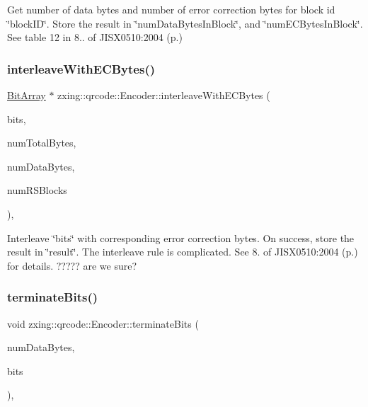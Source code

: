 Get number of data bytes and number of error correction bytes for block id \char`\"{}block\+I\+D\char`\"{}. Store the result in \char`\"{}num\+Data\+Bytes\+In\+Block\char`\"{}, and \char`\"{}num\+E\+C\+Bytes\+In\+Block\char`\"{}. See table 12 in 8.. of J\+I\+S\+X0510\+:2004 (p.) \mbox{\label{classzxing_1_1qrcode_1_1_encoder_a56e0adac48f552a92621f7510df2412f}} 
\subsubsection{\texorpdfstring{interleave\+With\+E\+C\+Bytes()}{interleaveWithECBytes()}}
{\footnotesize\ttfamily \mbox{\hyperlink{classzxing_1_1_bit_array}{Bit\+Array}} $\ast$ zxing\+::qrcode\+::\+Encoder\+::interleave\+With\+E\+C\+Bytes (\begin{DoxyParamCaption}\item[{const \mbox{\hyperlink{classzxing_1_1_bit_array}{Bit\+Array}} \&}]{bits,  }\item[{int}]{num\+Total\+Bytes,  }\item[{int}]{num\+Data\+Bytes,  }\item[{int}]{num\+R\+S\+Blocks }\end{DoxyParamCaption})\hspace{0.3cm}{\ttfamily [static]}, {\ttfamily [protected]}}

Interleave \char`\"{}bits\char`\"{} with corresponding error correction bytes. On success, store the result in \char`\"{}result\char`\"{}. The interleave rule is complicated. See 8. of J\+I\+S\+X0510\+:2004 (p.) for details. ????? are we sure? \mbox{\label{classzxing_1_1qrcode_1_1_encoder_acded0fc88e15822a03865e6c79591770}} 
\subsubsection{\texorpdfstring{terminate\+Bits()}{terminateBits()}}
{\footnotesize\ttfamily void zxing\+::qrcode\+::\+Encoder\+::terminate\+Bits (\begin{DoxyParamCaption}\item[{int}]{num\+Data\+Bytes,  }\item[{\mbox{\hyperlink{classzxing_1_1_bit_array}{Bit\+Array}} \&}]{bits }\end{DoxyParamCaption})\hspace{0.3cm}{\ttfamily [static]}, {\ttfamily [protected]}}


